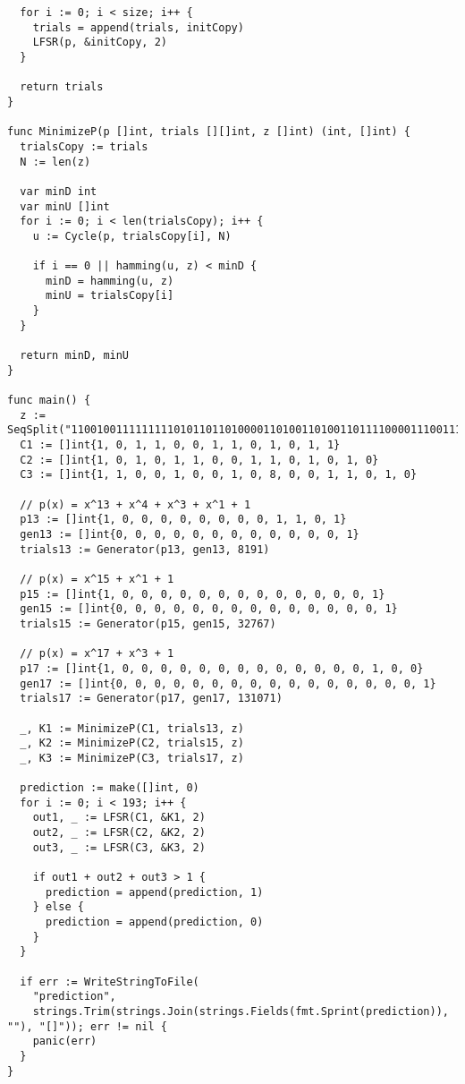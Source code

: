 \documentclass{article}
\theoremstyle{definition}
\theoremstyle{definition}
\theoremstyle{definition}
\begin{document}
\begin{verbatim}
  for i := 0; i < size; i++ {
    trials = append(trials, initCopy)
    LFSR(p, &initCopy, 2)
  }

  return trials
}

func MinimizeP(p []int, trials [][]int, z []int) (int, []int) {
  trialsCopy := trials
  N := len(z)

  var minD int
  var minU []int
  for i := 0; i < len(trialsCopy); i++ {
    u := Cycle(p, trialsCopy[i], N)

    if i == 0 || hamming(u, z) < minD {
      minD = hamming(u, z)
      minU = trialsCopy[i]
    }
  }

  return minD, minU
}

func main() {
  z := SeqSplit("1100100111111111010110110100001101001101001101111000011100111001011101111000100110011110010101011010011100110001010010100000101101010010011001001101101110110001010101010110100110100111010011011")
  C1 := []int{1, 0, 1, 1, 0, 0, 1, 1, 0, 1, 0, 1, 1}
  C2 := []int{1, 0, 1, 0, 1, 1, 0, 0, 1, 1, 0, 1, 0, 1, 0}
  C3 := []int{1, 1, 0, 0, 1, 0, 0, 1, 0, 8, 0, 0, 1, 1, 0, 1, 0}

  // p(x) = x^13 + x^4 + x^3 + x^1 + 1
  p13 := []int{1, 0, 0, 0, 0, 0, 0, 0, 0, 1, 1, 0, 1}
  gen13 := []int{0, 0, 0, 0, 0, 0, 0, 0, 0, 0, 0, 0, 1}
  trials13 := Generator(p13, gen13, 8191)

  // p(x) = x^15 + x^1 + 1
  p15 := []int{1, 0, 0, 0, 0, 0, 0, 0, 0, 0, 0, 0, 0, 0, 1}
  gen15 := []int{0, 0, 0, 0, 0, 0, 0, 0, 0, 0, 0, 0, 0, 0, 1}
  trials15 := Generator(p15, gen15, 32767)

  // p(x) = x^17 + x^3 + 1
  p17 := []int{1, 0, 0, 0, 0, 0, 0, 0, 0, 0, 0, 0, 0, 0, 1, 0, 0}
  gen17 := []int{0, 0, 0, 0, 0, 0, 0, 0, 0, 0, 0, 0, 0, 0, 0, 0, 1}
  trials17 := Generator(p17, gen17, 131071)

  _, K1 := MinimizeP(C1, trials13, z)
  _, K2 := MinimizeP(C2, trials15, z)
  _, K3 := MinimizeP(C3, trials17, z)

  prediction := make([]int, 0)
  for i := 0; i < 193; i++ {
    out1, _ := LFSR(C1, &K1, 2)
    out2, _ := LFSR(C2, &K2, 2)
    out3, _ := LFSR(C3, &K3, 2)

    if out1 + out2 + out3 > 1 {
      prediction = append(prediction, 1)
    } else {
      prediction = append(prediction, 0)
    }
  }

  if err := WriteStringToFile(
    "prediction",
    strings.Trim(strings.Join(strings.Fields(fmt.Sprint(prediction)), ""), "[]")); err != nil {
    panic(err)
  }
}
\end{verbatim}
\end{document}
